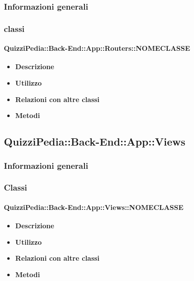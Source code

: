 \subsubsection{Informazioni generali}
\subsubsection{classi}
\paragraph{QuizziPedia::Back-End::App::Routers::NOMECLASSE}
	\begin{itemize}
		\item \textbf{Descrizione} \\
		\item \textbf{Utilizzo} \\
		\item \textbf{Relazioni con altre classi} \\
		\item \textbf{Metodi} \\
	\end{itemize}
	
\subsection{QuizziPedia::Back-End::App::Views}
\subsubsection{Informazioni generali}
\subsubsection{Classi}
\paragraph{QuizziPedia::Back-End::App::Views::NOMECLASSE}
	\begin{itemize}
		\item \textbf{Descrizione} \\
		\item \textbf{Utilizzo} \\
		\item \textbf{Relazioni con altre classi} \\
		\item \textbf{Metodi} \\
	\end{itemize}